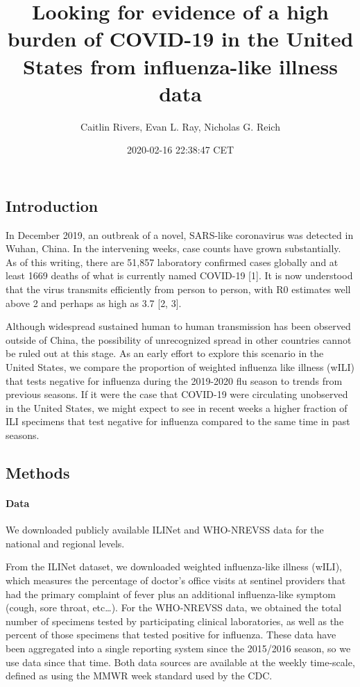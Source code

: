 \documentclass[]{article}
\title{Looking for evidence of a high burden of COVID-19 in the United States
from influenza-like illness data}
\author{Caitlin Rivers, Evan L. Ray, Nicholas G. Reich}
\date{2020-02-16 22:38:47 CET}
\let\oldparagraph\paragraph
\renewcommand{\paragraph}[1]{\oldparagraph{#1}\mbox{}}
\begin{document}
\maketitle

\hypertarget{introduction}{%
\subsection{Introduction}\label{introduction}}

In December 2019, an outbreak of a novel, SARS-like coronavirus was
detected in Wuhan, China. In the intervening weeks, case counts have
grown substantially. As of this writing, there are 51,857 laboratory
confirmed cases globally and at least 1669 deaths of what is currently
named COVID-19 {[}1{]}. It is now understood that the virus transmits
efficiently from person to person, with R0 estimates well above 2 and
perhaps as high as 3.7 {[}2, 3{]}.

Although widespread sustained human to human transmission has been
observed outside of China, the possibility of unrecognized spread in
other countries cannot be ruled out at this stage. As an early effort to
explore this scenario in the United States, we compare the proportion of
weighted influenza like illness (wILI) that tests negative for influenza
during the 2019-2020 flu season to trends from previous seasons. If it
were the case that COVID-19 were circulating unobserved in the United
States, we might expect to see in recent weeks a higher fraction of ILI
specimens that test negative for influenza compared to the same time in
past seasons.

\hypertarget{methods}{%
\subsection{Methods}\label{methods}}

\hypertarget{data}{%
\paragraph{Data}\label{data}}

We downloaded publicly available ILINet and WHO-NREVSS data for the
national and regional levels.

From the ILINet dataset, we downloaded weighted influenza-like illness
(wILI), which measures the percentage of doctor's office visits at
sentinel providers that had the primary complaint of fever plus an
additional influenza-like symptom (cough, sore throat, etc\ldots{}). For
the WHO-NREVSS data, we obtained the total number of specimens tested by
participating clinical laboratories, as well as the percent of those
specimens that tested positive for influenza. These data have been
aggregated into a single reporting system since the 2015/2016 season, so
we use data since that time. Both data sources are available at the
weekly time-scale, defined as using the MMWR week standard used by the
CDC.
\end{document}
